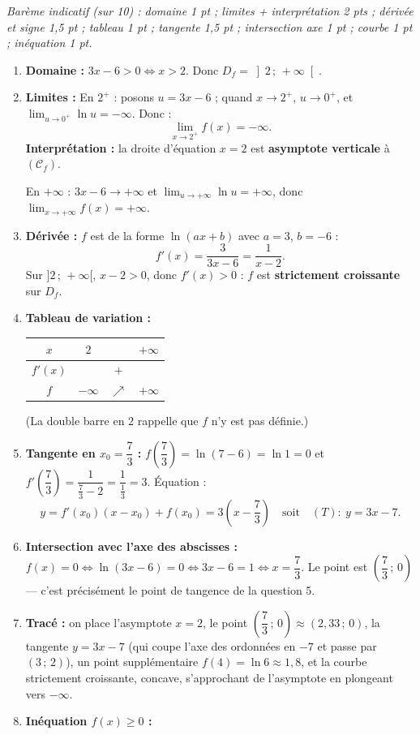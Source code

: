 \documentclass[11pt]{article}
\begin{document}
\begin{corrige}
\emph{Barème indicatif (sur 10) : domaine 1 pt ; limites + interprétation 2 pts ; dérivée et signe 1,5 pt ; tableau 1 pt ; tangente 1,5 pt ; intersection axe 1 pt ; courbe 1 pt ; inéquation 1 pt.}

\begin{enumerate}
\item \textbf{Domaine :} $3x-6>0 \iff x>2$. Donc $D_f=\left]2\,;\,+\infty\right[$.
\item \textbf{Limites :} En $2^+$ : posons $u=3x-6$ ; quand $x\to 2^+$, $u\to 0^+$, et $\displaystyle\lim_{u\to 0^+}\ln u=-\infty$. Donc :
\[ \lim_{x\to 2^+}f(x)=-\infty. \]
\textbf{Interprétation :} la droite d'équation $x=2$ est \textbf{asymptote verticale} à $(\mathcal{C}_f)$.

En $+\infty$ : $3x-6\to+\infty$ et $\displaystyle\lim_{u\to+\infty}\ln u=+\infty$, donc $\displaystyle\lim_{x\to+\infty}f(x)=+\infty$.
\item \textbf{Dérivée :} $f$ est de la forme $\ln(ax+b)$ avec $a=3$, $b=-6$ :
\[ f'(x)=\dfrac{3}{3x-6}=\dfrac{1}{x-2}. \]
Sur $]2\,;\,+\infty[$, $x-2>0$, donc $f'(x)>0$ : $f$ est \textbf{strictement croissante} sur $D_f$.
\item \textbf{Tableau de variation :}
\begin{center}
\begin{tabular}{|c|c||cc|}\hline
$x$ & $2$ & & $+\infty$ \\ \hline
$f'(x)$ & & $+$ & \\ \hline
$f$ & $-\infty$ & $\nearrow$ & $+\infty$ \\ \hline
\end{tabular}
\end{center}
(La double barre en $2$ rappelle que $f$ n'y est pas définie.)
\item \textbf{Tangente en $x_0=\dfrac{7}{3}$ :} $f\left(\dfrac{7}{3}\right)=\ln(7-6)=\ln 1=0$ et $f'\left(\dfrac{7}{3}\right)=\dfrac{1}{\frac{7}{3}-2}=\dfrac{1}{\frac{1}{3}}=3$. Équation :
\[ y=f'(x_0)(x-x_0)+f(x_0)=3\left(x-\dfrac{7}{3}\right) \quad\text{soit}\quad (T):\ y=3x-7. \]
\item \textbf{Intersection avec l'axe des abscisses :} $f(x)=0 \iff \ln(3x-6)=0 \iff 3x-6=1 \iff x=\dfrac{7}{3}$. Le point est $\left(\dfrac{7}{3}\,;\,0\right)$ — c'est précisément le point de tangence de la question 5.
\item \textbf{Tracé :} on place l'asymptote $x=2$, le point $\left(\dfrac{7}{3}\,;\,0\right)\approx(2{,}33\,;\,0)$, la tangente $y=3x-7$ (qui coupe l'axe des ordonnées en $-7$ et passe par $(3\,;\,2)$), un point supplémentaire $f(4)=\ln 6\approx 1{,}8$, et la courbe strictement croissante, concave, s'approchant de l'asymptote en plongeant vers $-\infty$.
\item \textbf{Inéquation $f(x)\geq 0$ :}


\end{enumerate}
\end{corrige}
\end{document}
